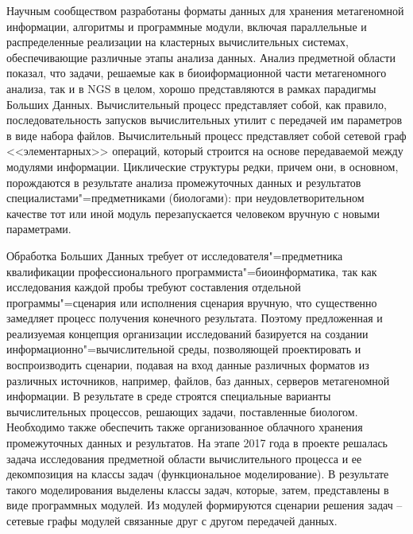 \documentclass[a4paper,12pt,openany,final]{extreport}
\begin{document}
Научным сообществом разработаны форматы данных для хранения метагеномной информации, алгоритмы и программные модули, включая параллельные и распределенные реализации на кластерных вычислительных системах, обеспечивающие различные этапы анализа данных. Анализ предметной области показал, что задачи, решаемые как в биоиформационной части метагеномного анализа, так и в NGS в целом, хорошо представляются в рамках парадигмы Больших Данных. Вычислительный процесс представляет собой, как правило, последовательность запусков вычислительных утилит с передачей им параметров в виде набора файлов. Вычислительный процесс представляет собой сетевой граф <<элементарных>> операций, который строится на основе передаваемой между модулями информации. Циклические структуры редки, причем они, в основном, порождаются в результате анализа промежуточных данных и результатов специалистами"=предметниками (биологами): при неудовлетворительном качестве тот или иной модуль перезапускается человеком вручную с новыми параметрами.

Обработка Больших Данных требует от исследователя"=предметника квалификации профессионального программиста"=биоинформатика, так как исследования каждой пробы требуют составления отдельной программы"=сценария или исполнения сценария вручную, что существенно замедляет процесс получения конечного результата. Поэтому предложенная и реализуемая концепция организации исследований базируется на создании информационно"=вычислительной среды, позволяющей проектировать и воспроизводить сценарии, подавая на вход данные различных форматов из различных источников, например, файлов, баз данных, серверов метагеномной информации. В результате в среде строятся специальные варианты вычислительных процессов, решающих задачи, поставленные биологом. Необходимо также обеспечить также организованное облачного хранения промежуточных данных и результатов. На этапе 2017 года в проекте решалась задача исследования предметной области вычислительного процесса и ее декомпозиция на классы задач (функциональное моделирование). В результате такого моделирования выделены классы задач, которые, затем, представлены в виде программных модулей. Из модулей формируются сценарии решения задач -- сетевые графы модулей связанные друг с другом передачей данных.
\end{document}
